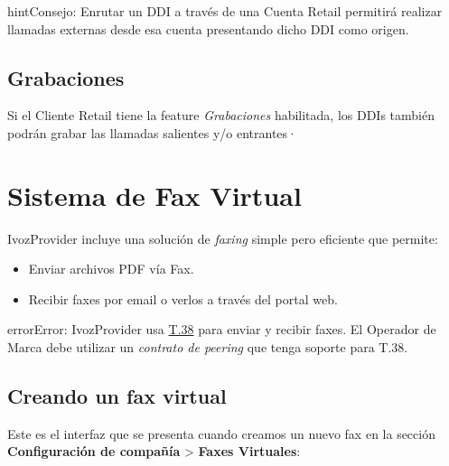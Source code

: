 \documentclass[letterpaper,10pt,spanish]{sphinxmanual}
\begin{document}
\begin{notice}{hint}{Consejo:}
Enrutar un DDI a través de una Cuenta Retail permitirá realizar llamadas externas desde esa cuenta presentando dicho DDI como origen.
\end{notice}


\subsection{Grabaciones}
\label{retail/retail_ddis:recordings}
Si el Cliente Retail tiene la feature \emph{Grabaciones} habilitada, los DDIs también podrán grabar las llamadas salientes y/o entrantes·


\section{Sistema de Fax Virtual}
\label{faxing/index:virtual-fax-system}\label{faxing/index::doc}\label{faxing/index:faxing-system}
IvozProvider incluye una solución de \emph{faxing} simple pero eficiente que permite:
\begin{itemize}
\item {} 
Enviar archivos PDF vía Fax.

\item {} 
Recibir faxes por email o verlos a través del portal web.

\end{itemize}

\begin{notice}{error}{Error:}
IvozProvider usa \href{http://www.voip-info.org/wiki/view/T.38}{T.38} para enviar y recibir faxes. El Operador de Marca debe utilizar un \emph{contrato  de peering} que tenga soporte para T.38.
\end{notice}


\subsection{Creando un fax virtual}
\label{faxing/index:creating-a-virtual-fax}
Este es el interfaz que se presenta cuando creamos un nuevo fax en la sección \textbf{Configuración de compañía} \textgreater{} \textbf{Faxes Virtuales}:

\end{document}
